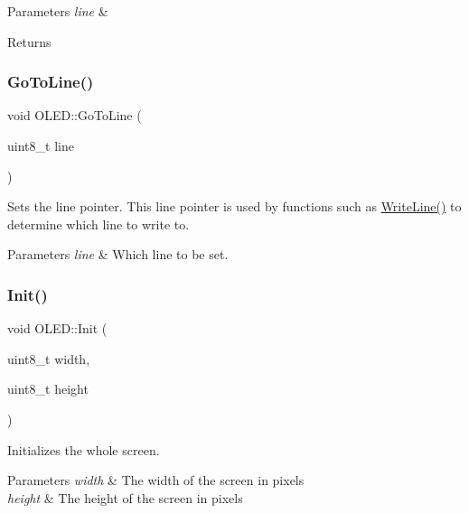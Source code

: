 \begin{DoxyParams}{Parameters}
{\em line} & \\
\hline
\end{DoxyParams}
\begin{DoxyReturn}{Returns}

\end{DoxyReturn}
\hypertarget{class_o_l_e_d_a8d314130676b104ed959b92ab4bac25e}{}\label{class_o_l_e_d_a8d314130676b104ed959b92ab4bac25e} 
\subsubsection{\texorpdfstring{Go\+To\+Line()}{GoToLine()}}
{\footnotesize\ttfamily void O\+L\+E\+D\+::\+Go\+To\+Line (\begin{DoxyParamCaption}\item[{uint8\+\_\+t}]{line }\end{DoxyParamCaption})}

Sets the line pointer. This line pointer is used by functions such as \hyperlink{class_o_l_e_d_a0ffccb4fd874b997c869c5d511f76df8}{Write\+Line()} to determine which line to write to. 
\begin{DoxyParams}{Parameters}
{\em line} & Which line to be set. \\
\hline
\end{DoxyParams}
\hypertarget{class_o_l_e_d_a2c8205c8eac9d7a2b181657561e9b4d2}{}\label{class_o_l_e_d_a2c8205c8eac9d7a2b181657561e9b4d2} 
\subsubsection{\texorpdfstring{Init()}{Init()}}
{\footnotesize\ttfamily void O\+L\+E\+D\+::\+Init (\begin{DoxyParamCaption}\item[{uint8\+\_\+t}]{width,  }\item[{uint8\+\_\+t}]{height }\end{DoxyParamCaption})}

Initializes the whole screen. 
\begin{DoxyParams}{Parameters}
{\em width} & The width of the screen in pixels \\
\hline
{\em height} & The height of the screen in pixels \\
\hline
\end{DoxyParams}
\hypertarget{class_o_l_e_d_a3efa34861b4ae0bc5323f6b7cf1d8a01}{}\label{class_o_l_e_d_a3efa34861b4ae0bc5323f6b7cf1d8a01} 
